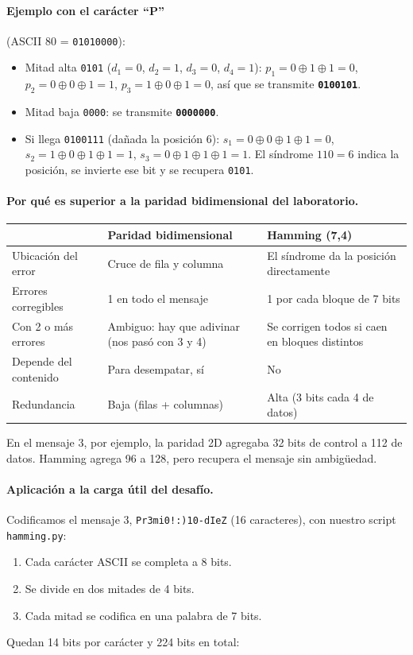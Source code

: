 \documentclass[11pt,a4paper]{article}
\begin{document}
\paragraph{Ejemplo con el carácter ``P''} (ASCII 80 = \texttt{01010000}):
\begin{itemize}
  \item Mitad alta \texttt{0101} ($d_1=0$, $d_2=1$, $d_3=0$, $d_4=1$): $p_1 = 0\oplus1\oplus1 = 0$, $p_2 = 0\oplus0\oplus1 = 1$, $p_3 = 1\oplus0\oplus1 = 0$, así que se transmite \textbf{\texttt{0100101}}.
  \item Mitad baja \texttt{0000}: se transmite \textbf{\texttt{0000000}}.
  \item Si llega \texttt{0100111} (dañada la posición 6): $s_1 = 0\oplus0\oplus1\oplus1 = 0$, $s_2 = 1\oplus0\oplus1\oplus1 = 1$, $s_3 = 0\oplus1\oplus1\oplus1 = 1$. El síndrome $110 = 6$ indica la posición, se invierte ese bit y se recupera \texttt{0101}.
\end{itemize}

\paragraph{Por qué es superior a la paridad bidimensional del laboratorio.}

\begin{center}
\begin{tabular}{|l|p{5.2cm}|p{5.2cm}|}
\hline
 & \textbf{Paridad bidimensional} & \textbf{Hamming (7,4)} \\
\hline
Ubicación del error & Cruce de fila y columna & El síndrome da la posición directamente \\
Errores corregibles & 1 en todo el mensaje & 1 por cada bloque de 7 bits \\
Con 2 o más errores & Ambiguo: hay que adivinar (nos pasó con 3 y 4) & Se corrigen todos si caen en bloques distintos \\
Depende del contenido & Para desempatar, sí & No \\
Redundancia & Baja (filas + columnas) & Alta (3 bits cada 4 de datos) \\
\hline
\end{tabular}
\end{center}

En el mensaje 3, por ejemplo, la paridad 2D agregaba 32 bits de control a 112 de datos. Hamming agrega 96 a 128, pero recupera el mensaje sin ambigüedad.

\paragraph{Aplicación a la carga útil del desafío.} Codificamos el mensaje 3, \texttt{Pr3mi0!:)10-dIeZ} (16 caracteres), con nuestro script \texttt{hamming.py}:
\begin{enumerate}
  \item Cada carácter ASCII se completa a 8 bits.
  \item Se divide en dos mitades de 4 bits.
  \item Cada mitad se codifica en una palabra de 7 bits.
\end{enumerate}
Quedan 14 bits por carácter y 224 bits en total:
\end{document}
